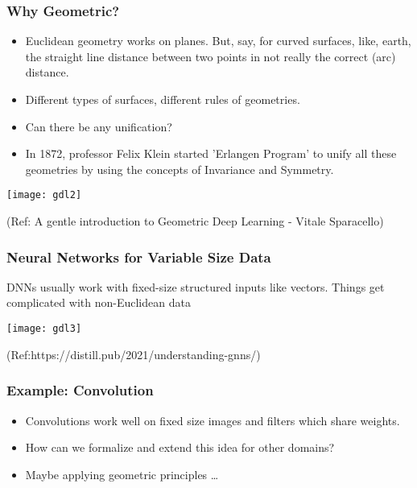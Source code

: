 \begin{frame}[fragile]\frametitle{Why Geometric?}

\begin{itemize}
\item Euclidean geometry works on planes. But, say, for curved surfaces, like, earth, the straight line distance between two points in not really the correct (arc) distance.
\item Different types of surfaces, different rules of geometries.
\item Can there be any unification?
\item In 1872, professor Felix Klein started 'Erlangen Program' to unify all these geometries by using the concepts of Invariance and Symmetry.
\end{itemize}
	  
\begin{center}
\texttt{[image: gdl2]}
\end{center}

{\tiny (Ref: A gentle introduction to Geometric Deep Learning - Vitale Sparacello)}

\end{frame}

\begin{frame}[fragile]\frametitle{Neural Networks for Variable Size Data}

DNNs usually work with fixed-size structured inputs like vectors. Things get complicated with non-Euclidean data
	  
\begin{center}
\texttt{[image: gdl3]}
\end{center}

{\tiny (Ref:https://distill.pub/2021/understanding-gnns/)}

\end{frame}

\begin{frame}[fragile]\frametitle{Example: Convolution}

\begin{itemize}
\item Convolutions work well on fixed size images and filters which share weights.
\item How can we formalize and extend this idea for other domains? 
\item Maybe applying geometric principles \ldots
\end{itemize}
	  
\end{frame}


